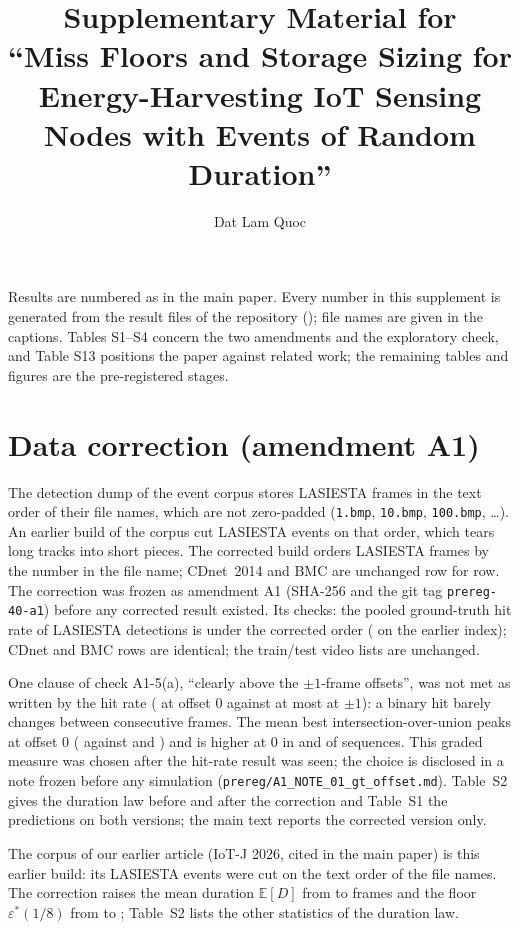 \documentclass[10pt]{article}
\title{Supplementary Material for\\``Miss Floors and Storage Sizing for Energy-Harvesting IoT Sensing Nodes with Events of Random Duration''}
\author{Dat Lam Quoc}
\date{}
\newcommand{\eps}{\varepsilon}
\newcommand{\E}{\mathbb{E}}
\begin{document}
\maketitle
Results are numbered as in the main paper. Every number in this supplement is generated from the result files of the repository (\repoURL); file names are given in the captions. Tables S1--S4 concern the two amendments and the exploratory check, and Table S13 positions the paper against related work; the remaining tables and figures are the pre-registered stages.



\section{Data correction (amendment A1)}
The detection dump of the event corpus stores LASIESTA frames in the text order of their file names, which are not zero-padded (\texttt{1.bmp}, \texttt{10.bmp}, \texttt{100.bmp}, \ldots). An earlier build of the corpus cut LASIESTA events on that order, which tears long tracks into short pieces. The corrected build orders LASIESTA frames by the number in the file name; CDnet~2014 and BMC are unchanged row for row. The correction was frozen as amendment A1 (SHA-256 and the git tag \texttt{prereg-40-a1}) before any corrected result existed. Its checks: the pooled ground-truth hit rate of LASIESTA detections is \AoneHit{} under the corrected order (\AoneHitIdx{} on the earlier index); CDnet and BMC rows are identical; the train/test video lists are unchanged.

One clause of check A1-5(a), ``clearly above the $\pm1$-frame offsets'', was not met as written by the hit rate (\AoneHit{} at offset 0 against at most \AoneHitPm{} at $\pm1$): a binary hit barely changes between consecutive frames. The mean best intersection-over-union peaks at offset 0 (\AoneIoUz{} against \AoneIoUm{} and \AoneIoUp) and is higher at 0 in \AoneSeqM{} and \AoneSeqP{} of \AoneNseq{} sequences. This graded measure was chosen after the hit-rate result was seen; the choice is disclosed in a note frozen before any simulation (\texttt{prereg/A1\_NOTE\_01\_gt\_offset.md}). Table~S2 gives the duration law before and after the correction and Table~S1 the predictions on both versions; the main text reports the corrected version only.

The corpus of our earlier article (IoT-J 2026, cited in the main paper) is this earlier build: its LASIESTA events were cut on the text order of the file names. The correction raises the mean duration $\E[D]$ from \VoneED{} to \ED{} frames and the floor $\eps^*(1/8)$ from \VoneEpsEight{} to \epsKeight{}; Table~S2 lists the other statistics of the duration law.
\end{document}
